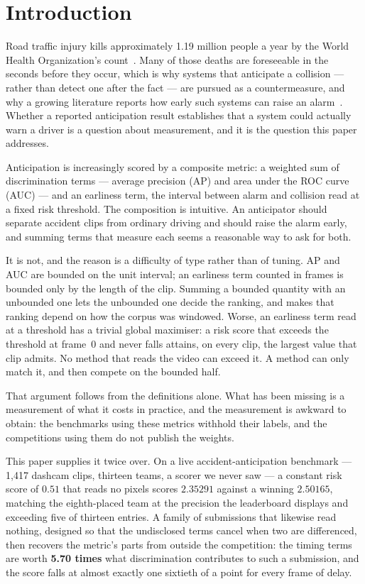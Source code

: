 \section{Introduction}
\label{sec:intro}

Road traffic injury kills approximately 1.19 million people a year by the World
Health Organization's count~\cite{who2023}. Many of those deaths are
foreseeable in the seconds before they occur, which is why systems that
anticipate a collision --- rather than detect one after the fact --- are
pursued as a countermeasure, and why a growing literature reports how early
such systems can raise an alarm~\cite{zhang2025review}. Whether a reported
anticipation result establishes that a system could actually warn a driver is a
question about measurement, and it is the question this paper addresses.

Anticipation is increasingly scored by a composite metric: a weighted sum of
discrimination terms --- average precision (AP) and area under the ROC curve
(AUC) --- and an earliness term, the interval between alarm and collision read
at a fixed risk threshold. The composition is intuitive. An anticipator should
separate accident clips from ordinary driving and should raise the alarm early,
and summing terms that measure each seems a reasonable way to ask for both.

It is not, and the reason is a difficulty of type rather than of tuning. AP and
AUC are bounded on the unit interval; an earliness term counted in frames is
bounded only by the length of the clip. Summing a bounded quantity with an
unbounded one lets the unbounded one decide the ranking, and makes that ranking
depend on how the corpus was windowed. Worse, an earliness term read at a
threshold has a trivial global maximiser: a risk score that exceeds the
threshold at frame~0 and never falls attains, on every clip, the largest value
that clip admits. No method that reads the video can exceed it. A method can
only match it, and then compete on the bounded half.

That argument follows from the definitions alone. What has been missing is a
measurement of what it costs in practice, and the measurement is awkward to
obtain: the benchmarks using these metrics withhold their labels, and the
competitions using them do not publish the weights.

This paper supplies it twice over. On a live accident-anticipation benchmark
--- 1{,}417 dashcam clips, thirteen teams, a scorer we never saw --- a constant
risk score of $0.51$ that reads no pixels scores $2.35291$ against a winning
$2.50165$, matching the eighth-placed team at the precision the leaderboard
displays and exceeding five of thirteen entries. A family of submissions that
likewise read nothing, designed so that the undisclosed terms cancel when two
are differenced, then recovers the metric's parts from outside the competition:
the timing terms are worth \textbf{5.70 times} what discrimination contributes
to such a submission, and the score falls at almost exactly one sixtieth of a
point for every frame of delay.

